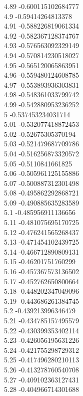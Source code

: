 {4.89	-0.600115102684777\\
4.9	-0.59414264813378\\
4.91	-0.588226819061334\\
4.92	-0.582367128374767\\
4.93	-0.576563092329149\\
4.94	-0.570814230518027\\
4.95	-0.565120065863951\\
4.96	-0.559480124608785\\
4.97	-0.553893936303831\\
4.98	-0.548361033799742\\
4.99	-0.542880953236252\\
5	-0.537453234031714\\
5.01	-0.532077418872453\\
5.02	-0.52675305370194\\
5.03	-0.521479687709786\\
5.04	-0.516256873320572\\
5.05	-0.5110841661825\\
5.06	-0.505961125155886\\
5.07	-0.500887312301498\\
5.08	-0.495862292868721\\
5.09	-0.490885635283589\\
5.1	-0.485956911136656\\
5.11	-0.481075695170725\\
5.12	-0.476241565268437\\
5.13	-0.471454102439725\\
5.14	-0.466712890809131\\
5.15	-0.46201751760299\\
5.16	-0.457367573136502\\
5.17	-0.452762650800664\\
5.18	-0.448202347049096\\
5.19	-0.443686261384745\\
5.2	-0.439213996346479\\
5.21	-0.434785157495579\\
5.22	-0.430399353402114\\
5.23	-0.426056195631226\\
5.24	-0.421755298729312\\
5.25	-0.417496280210113\\
5.26	-0.413278760540708\\
5.27	-0.409102363127431\\
5.28	-0.404966714301688\\
}
